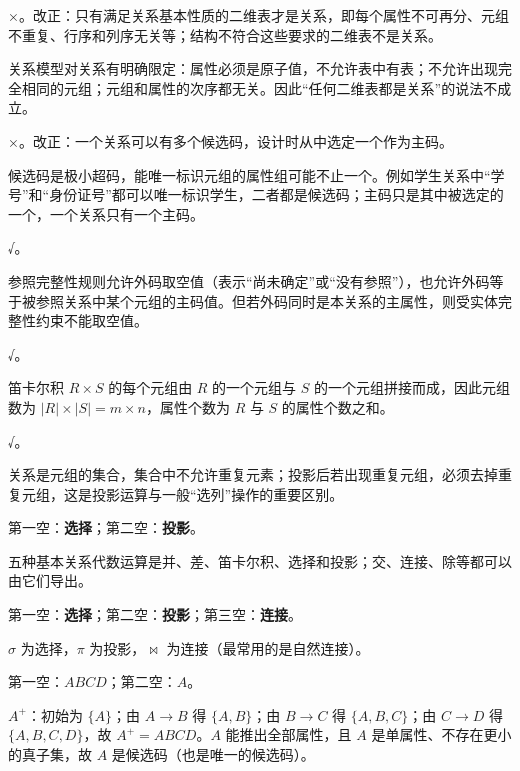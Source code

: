 \documentclass[a4paper,11pt]{article}
\begin{document}

\q ×。改正：只有满足关系基本性质的二维表才是关系，即每个属性不可再分、元组不重复、行序和列序无关等；结构不符合这些要求的二维表不是关系。\begin{analysis}关系模型对关系有明确限定：属性必须是原子值，不允许表中有表；不允许出现完全相同的元组；元组和属性的次序都无关。因此“任何二维表都是关系”的说法不成立。\end{analysis}

\q ×。改正：一个关系可以有多个候选码，设计时从中选定一个作为主码。\begin{analysis}候选码是极小超码，能唯一标识元组的属性组可能不止一个。例如学生关系中“学号”和“身份证号”都可以唯一标识学生，二者都是候选码；主码只是其中被选定的一个，一个关系只有一个主码。\end{analysis}

\q √。\begin{analysis}参照完整性规则允许外码取空值（表示“尚未确定”或“没有参照”），也允许外码等于被参照关系中某个元组的主码值。但若外码同时是本关系的主属性，则受实体完整性约束不能取空值。\end{analysis}

\q √。\begin{analysis}笛卡尔积 $R\times S$ 的每个元组由 $R$ 的一个元组与 $S$ 的一个元组拼接而成，因此元组数为 $|R|\times|S|=m\times n$，属性个数为 $R$ 与 $S$ 的属性个数之和。\end{analysis}

\q √。\begin{analysis}关系是元组的集合，集合中不允许重复元素；投影后若出现重复元组，必须去掉重复元组，这是投影运算与一般“选列”操作的重要区别。\end{analysis}


\q 第一空：\textbf{选择}；第二空：\textbf{投影}。\begin{analysis}五种基本关系代数运算是并、差、笛卡尔积、选择和投影；交、连接、除等都可以由它们导出。\end{analysis}

\q 第一空：\textbf{选择}；第二空：\textbf{投影}；第三空：\textbf{连接}。\begin{analysis}$\sigma$ 为选择，$\pi$ 为投影，$\bowtie$ 为连接（最常用的是自然连接）。\end{analysis}

\q 第一空：\textbf{$ABCD$}；第二空：\textbf{$A$}。\begin{analysis}$A^{+}$：初始为 $\{A\}$；由 $A\to B$ 得 $\{A,B\}$；由 $B\to C$ 得 $\{A,B,C\}$；由 $C\to D$ 得 $\{A,B,C,D\}$，故 $A^{+}=ABCD$。$A$ 能推出全部属性，且 $A$ 是单属性、不存在更小的真子集，故 $A$ 是候选码（也是唯一的候选码）。\end{analysis}
\end{document}
